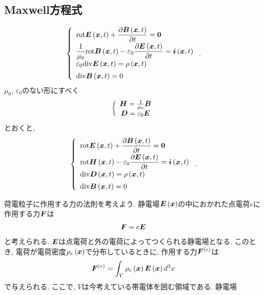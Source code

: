 \documentclass[10pt,a4paper]{jsarticle}
\begin{document}
\subsection{Maxwell方程式}
\begin{align*}
    \left\{ \begin{array}{l}
        \displaystyle \mathrm{rot} \bm{E} \left( \bm{x}, t \right) + \frac{\partial \bm{B} \left( \bm{x}, t \right)}{\partial t} = \mathbf{0} \\[5pt]
        \displaystyle \frac{1}{\mu_0} \mathrm{rot} \bm{B} \left( \bm{x}, t \right) - \varepsilon_0 \frac{\partial \bm{E} \left( \bm{x}, t \right)}{\partial t} = \bm{i} \left( \bm{x}, t \right) \\[5pt]
        \displaystyle \varepsilon_0 \mathrm{div} \bm{E} \left( \bm{x}, t \right) = \rho \left( \bm{x}, t \right) \\[5pt]
        \displaystyle \mathrm{div} \bm{B} \left( \bm{x}, t \right) = 0 \\
    \end{array} \right. .
\end{align*}
$\mu_0$, $\varepsilon_0$のない形にすべく
\begin{align*}
    \left\{ \begin{array}{c}
        \bm{H} = \frac{1}{\mu_0 } \bm{B} \\
        \bm{D} = \varepsilon_0 \bm{E}
    \end{array} \right. 
\end{align*}
とおくと, 
\begin{align*}
    \left\{ \begin{array}{l}
        \displaystyle \mathrm{rot} \bm{E} \left( \bm{x}, t \right) + \frac{\partial \bm{B} \left( \bm{x}, t \right)}{\partial t} = \mathbf{0} \\[5pt]
        \displaystyle \mathrm{rot} \bm{H} \left( \bm{x}, t \right) - \varepsilon_0 \frac{\partial \bm{E} \left( \bm{x}, t \right)}{\partial t} = \bm{i} \left( \bm{x}, t \right) \\[5pt]
        \displaystyle \mathrm{div} \bm{D} \left( \bm{x}, t \right) = \rho \left( \bm{x}, t \right) \\[5pt]
        \displaystyle \mathrm{div} \bm{B} \left( \bm{x}, t \right) = 0 \\
    \end{array} \right.  .   
\end{align*}\par
荷電粒子に作用する力の法則を考えよう. 静電場$\bm{E} \left( \bm{x} \right)$の中におかれた点電荷$e$に作用する力$\bm{F}$は
\begin{align*}
    \bm{F} = e \bm{E} 
\end{align*}
と考えられる. $\bm{E}$は点電荷と外の電荷によってつくられる静電場となる. このとき, 電荷が電荷密度$\rho_e \left( \bm{x} \right) $で分布しているときに, 作用する力$\bm{F}^{(e)}$は
\begin{align*}
    \bm{F}^{(e)} = \int_V \rho_e \left( \bm{x} \right) \bm{E} \left( \bm{x} \right) d^3 x
\end{align*}
で与えられる. ここで, $V$は今考えている帯電体を囲む領域である. 静電場
\end{document}

